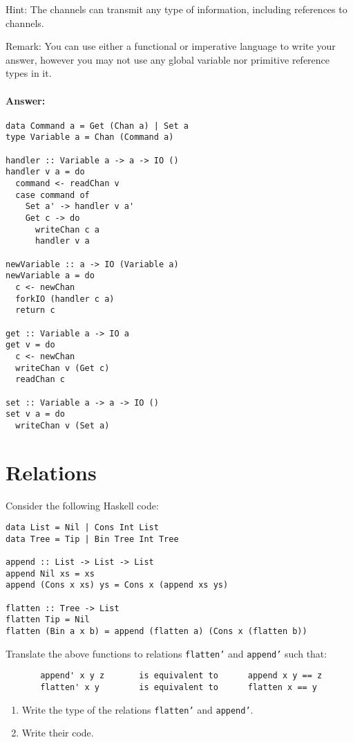 \documentclass{article}
\newcommand{\answer}[0]{\paragraph{Answer:}}
\begin{document}
Hint: The channels can transmit any type of information, including
references to channels.

Remark: You can use either a functional or imperative language to
write your answer, however you may not use any global variable nor
primitive reference types in it.

\answer{
\begin{verbatim}    
data Command a = Get (Chan a) | Set a
type Variable a = Chan (Command a)

handler :: Variable a -> a -> IO ()
handler v a = do
  command <- readChan v
  case command of
    Set a' -> handler v a'
    Get c -> do 
      writeChan c a
      handler v a

newVariable :: a -> IO (Variable a)
newVariable a = do
  c <- newChan
  forkIO (handler c a)
  return c

get :: Variable a -> IO a
get v = do
  c <- newChan
  writeChan v (Get c)
  readChan c
  
set :: Variable a -> a -> IO ()
set v a = do
  writeChan v (Set a)
\end{verbatim}
}

\newpage
\section{Relations}

Consider the following Haskell code:

\begin{verbatim}
data List = Nil | Cons Int List
data Tree = Tip | Bin Tree Int Tree

append :: List -> List -> List
append Nil xs = xs
append (Cons x xs) ys = Cons x (append xs ys)

flatten :: Tree -> List
flatten Tip = Nil
flatten (Bin a x b) = append (flatten a) (Cons x (flatten b))
\end{verbatim}

Translate the above functions to relations \texttt{flatten'} and
\texttt{append'} such that:
\begin{verbatim}
       append' x y z       is equivalent to      append x y == z
       flatten' x y        is equivalent to      flatten x == y
\end{verbatim}

\begin{enumerate}
\item Write the type of the relations \texttt{flatten'} and
  \texttt{append'}. 
\item Write their code. 
\end{enumerate}
\end{document}
